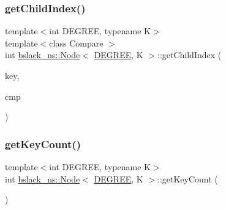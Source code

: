 \mbox{\label{structbslack__ns_1_1Node_aa383d3077279fb197654f01d68d4fe7a}} 
\subsubsection{\texorpdfstring{get\+Child\+Index()}{getChildIndex()}}
{\footnotesize\ttfamily template$<$int D\+E\+G\+R\+EE, typename K$>$ \\
template$<$class Compare $>$ \\
int \hyperlink{structbslack__ns_1_1Node}{bslack\+\_\+ns\+::\+Node}$<$ \hyperlink{brown__sigouin__abtree__kcas_2adapter_8h_a5d88b17d70c985f2f2b8e987037fd6dd}{D\+E\+G\+R\+EE}, K $>$\+::get\+Child\+Index (\begin{DoxyParamCaption}\item[{const K \&}]{key,  }\item[{Compare}]{cmp }\end{DoxyParamCaption})\hspace{0.3cm}{\ttfamily [inline]}}

\mbox{\label{structbslack__ns_1_1Node_a5119086e7ee24063fb0f9a4ab3aa7ccc}} 
\subsubsection{\texorpdfstring{get\+Key\+Count()}{getKeyCount()}}
{\footnotesize\ttfamily template$<$int D\+E\+G\+R\+EE, typename K$>$ \\
int \hyperlink{structbslack__ns_1_1Node}{bslack\+\_\+ns\+::\+Node}$<$ \hyperlink{brown__sigouin__abtree__kcas_2adapter_8h_a5d88b17d70c985f2f2b8e987037fd6dd}{D\+E\+G\+R\+EE}, K $>$\+::get\+Key\+Count (\begin{DoxyParamCaption}{ }\end{DoxyParamCaption})\hspace{0.3cm}{\ttfamily [inline]}}

\mbox{\label{structbslack__ns_1_1Node_ac32916848cce9c3f70a92d770dcf2d97}} 
